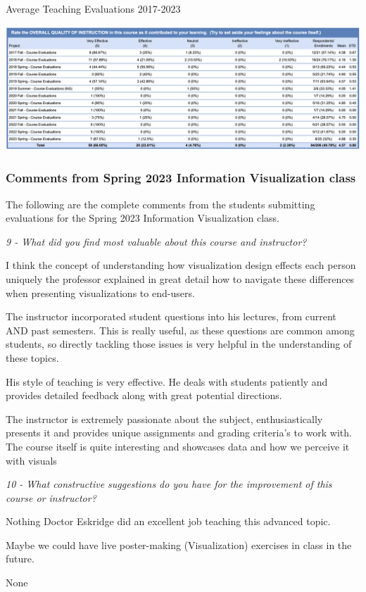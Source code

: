 \documentclass[12pt,letterpaper]{report}
\begin{document}
\begin{table}[ht]
\caption{Average Teaching Evaluations 2017-2023} 
\label{tabeval}
\centering
\includegraphics[width=\textwidth]{img/avgteachingevals.png}
\end{table}

\subsubsection*{Comments from Spring 2023 Information Visualization class}
The following are the complete comments from the students submitting evaluations for the Spring 2023 Information Visualization class.

\textit{9 - What did you find most valuable about this course and instructor?}
{\selectfont
\begin{tablist}
\item \tab{}I think the concept of understanding how visualization design effects each person uniquely the professor explained in great detail how to navigate these differences when presenting visualizations to end-users.
\item \tab{}The instructor incorporated student questions into his lectures, from current AND past semesters. This is really useful, as these questions are common among students, so directly tackling those issues is very helpful in the understanding of these topics.
\item \tab{}His style of teaching is very effective. He deals with students patiently and provides detailed feedback along with great potential directions.
\item \tab{}The instructor is extremely passionate about the subject, enthusiastically presents it and provides unique assignments and grading criteria's to work with. The course itself is quite interesting and showcases data and how we perceive it with visuals
\end{tablist}
}
\newpage
\textit{10 - What constructive suggestions do you have for the improvement of this course or instructor?}
{\selectfont
\begin{tablist}
\item \tab{}Nothing Doctor Eskridge did an excellent job teaching this advanced topic.
\item \tab{}Maybe we could have live poster-making (Visualization) exercises in class in the future. 
\item \tab{}None
\end{tablist}
}
\end{document}
